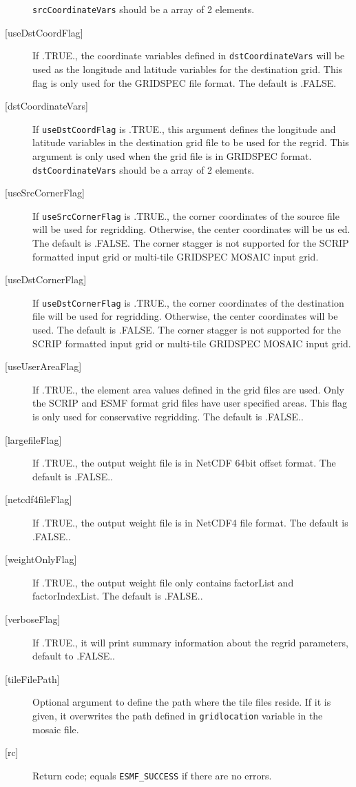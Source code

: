 \begin{description}
       {\tt srcCoordinateVars} should be a array of 2 elements.
     \item [{[useDstCoordFlag]}]
       If .TRUE., the coordinate variables defined in {\tt dstCoordinateVars} will
       be used as the longitude and latitude variables for the destination grid.
       This flag is only used for the GRIDSPEC file format.  The default is .FALSE.
     \item [{[dstCoordinateVars]}]
       If {\tt useDstCoordFlag} is .TRUE., this argument defines the longitude and
       latitude variables in the destination grid file to be used for the regrid.
       This argument is only used when the grid file is in GRIDSPEC format.
       {\tt dstCoordinateVars} should be a array of 2 elements.
     \item [{[useSrcCornerFlag]}]
       If {\tt useSrcCornerFlag} is .TRUE., the corner coordinates of the source file
       will be used for regridding. Otherwise, the center coordinates will be us ed.
       The default is .FALSE. The corner stagger is not supported for the SCRIP formatted input
       grid or multi-tile GRIDSPEC MOSAIC input grid.
     \item [{[useDstCornerFlag]}]
       If {\tt useDstCornerFlag} is .TRUE., the corner coordinates of the destination file
       will be used for regridding. Otherwise, the center coordinates will be used.
       The default is .FALSE. The corner stagger is not supported for the SCRIP formatted input
       grid or multi-tile GRIDSPEC MOSAIC input grid.
     \item [{[useUserAreaFlag]}]
       If .TRUE., the element area values defined in the grid files are used.
       Only the SCRIP and ESMF format grid files have user specified areas. This flag
       is only used for conservative regridding. The default is .FALSE..
     \item [{[largefileFlag]}]
       If .TRUE., the output weight file is in NetCDF 64bit offset format.
       The default is .FALSE..
     \item [{[netcdf4fileFlag]}]
       If .TRUE., the output weight file is in NetCDF4 file format.
       The default is .FALSE..
     \item [{[weightOnlyFlag]}]
       If .TRUE., the output weight file only contains factorList and factorIndexList.
       The default is .FALSE..
     \item [{[verboseFlag]}]
       If .TRUE., it will print summary information about the regrid parameters,
       default to .FALSE..
     \item[{[tileFilePath]}]
       Optional argument to define the path where the tile files reside. If it
       is given, it overwrites the path defined in {\tt gridlocation} variable
       in the mosaic file.
     \item [{[rc]}]
       Return code; equals {\tt ESMF\_SUCCESS} if there are no errors.
     \end{description} 
 
